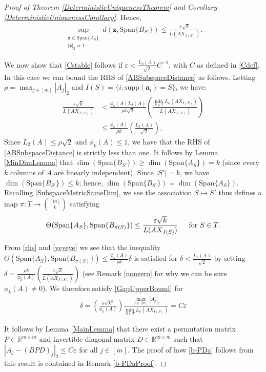 \documentclass[journal, twocolumn]{IEEEtran}
\begin{document}
\begin{proof}[Proof of Theorem \ref{DeterministicUniquenessTheorem} and Corollary \ref{DeterministicUniquenessCorollary}]
Hence,
\begin{align}\label{ABSubspaceDistance}
\sup_{ \substack{ \mathbf{z} \in \text{Span}\{A_{S}\} \\ |\mathbf{z}|_2 = 1} } d(\mathbf{z}, \text{Span}\{B_{S'}\}) \leq \frac{\varepsilon\sqrt{k}}{L(AX_{J(S)})}.
\end{align}

We now show that \eqref{Cstable} follows if $\varepsilon < \frac{L_2(A)}{\sqrt{2}}C^{-1}$, with $C$ as defined in \eqref{Cdef}. In this case we can bound the RHS of \eqref {ABSubspaceDistance} as follows. Letting $\rho = \max_{j \in [m]} |A_j|_2$ and $I(S) = \{i: \text{supp}(\mathbf{a}_i)=S\}$, we have:
\begin{align}\label{rhs}
\frac{\varepsilon\sqrt{k}}{L(AX_{J(S)})} 
&<  \frac{\phi_k(A) L_2(A)}{\rho k \sqrt{2}} \left( \frac{\min_{S \in T}L_k(AX_{I(S)})}{L(AX_{J(S)})} \right) \nonumber \\
&\leq \frac{\phi_k(A)}{\rho k} \left( \frac{L_2(A)}{\sqrt{2}} \right),
\end{align}
%
Since $L_2(A) \leq \rho \sqrt{2}$ and $\phi_k(A) \leq 1$, we have that the RHS of \eqref{ABSubspaceDistance} is strictly less than one. It follows by Lemma \ref{MinDimLemma} that $\dim(\text{Span}\{B_{S'}\}) \geq \dim(\text{Span}\{A_{S}\}) = k$ (since every $k$ columns of $A$ are linearly independent). Since $|S'| = k$, we have $\dim(\text{Span}\{B_{S'}\}) \leq k$; hence, $\dim(\text{Span}\{B_{S'}\}) = \dim(\text{Span}\{A_{S}\})$. Recalling \eqref{SubspaceMetricSameDim},  we see the association $S \mapsto S'$ thus defines a map $\pi: T \to {[m] \choose k}$ satisfying
\begin{align}\label{yeyeye}
\Theta(\text{Span}\{A_{S}\}, \text{Span}\{B_{\pi(S)}\}) \leq \frac{\varepsilon\sqrt{k}}{L(AX_{J(S)})} \indent \text{for } S \in T.
\end{align}

From \eqref{rhs} and \eqref{yeyeye} we see that the inequality $\Theta(\text{Span}\{A_{S}\}, \text{Span}\{B_{\pi(S)}\}) \leq \frac{ \phi_k(A) }{\rho k} \delta$ is satisfied for $\delta < \frac{L_2(A)}{\sqrt{2}}$ by setting $\delta = \frac{ \rho k}{ \phi_k(A) } \left(  \frac{\varepsilon \sqrt{k}}{L(AX_{J(S)})} \right)$ (see Remark \ref{nonzero} for why we can be sure $\phi_k(A) \neq 0$). We therefore satisfy \eqref{GapUpperBound} for 
\begin{align}
\delta = \left( \frac{ \varepsilon \sqrt{k^3}}{ \phi_k(A) } \right) \frac{\max_{j \in [m]} |A_j|_2}{\min_{S \in T} L_k(AX_{I(S)})}
= C\varepsilon
\end{align}

It follows by Lemma \ref{MainLemma} that there exist a permutation matrix $P \in \mathbb{R}^{m \times m}$ and invertible diagonal matrix $D \in \mathbb{R}^{m \times m}$ such that $|A_j - (BPD)_j|_2 \leq C\varepsilon$ for all $j \in [m]$. The proof of how \eqref{b-PDa} follows from this result is contained in Remark \ref{b-PDaProof}.
\end{proof}
\end{document}
